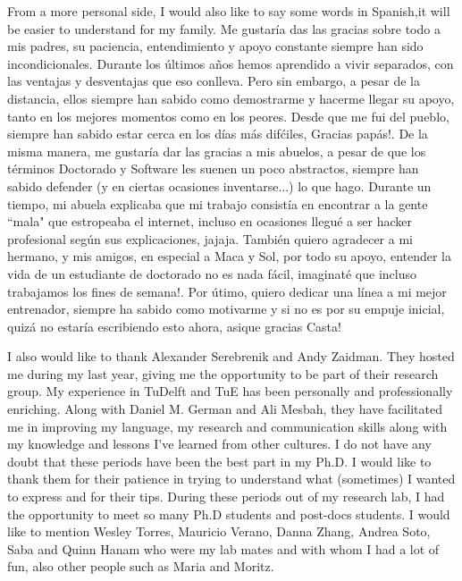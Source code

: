 \documentclass[a4paper, 12pt]{book}
\begin{document}
From a more personal side, I would also like to say some words in Spanish,it will be easier to understand for my family. Me gustar\'ia das las gracias sobre todo a mis padres, su paciencia, entendimiento y apoyo constante siempre han sido incondicionales. Durante los \'ultimos a\~nos hemos aprendido a vivir separados, con las ventajas y desventajas que eso conlleva. Pero sin embargo, a pesar de la distancia, ellos siempre han sabido como demostrarme y hacerme llegar su apoyo, tanto en los mejores momentos como en los peores. Desde que me fui del pueblo, siempre han sabido estar cerca en los d\'ias m\'as dif\'ciles, Gracias pap\'as!. De la misma manera, me gustar\'ia dar las gracias a mis abuelos, a pesar de que los t\'erminos Doctorado y Software les suenen un poco abstractos, siempre han sabido defender (y en ciertas ocasiones inventarse...) lo que hago. Durante un tiempo, mi abuela explicaba que mi trabajo consist\'ia en encontrar a la gente ``mala" que estropeaba el internet, incluso en ocasiones llegu\'e a ser  hacker profesional seg\'un sus explicaciones, jajaja. Tambi\'en quiero agradecer a mi hermano, y mis amigos, en especial a Maca y Sol, por todo su apoyo, entender la vida de un estudiante de doctorado no es nada f\'acil, imaginat\'e que incluso trabajamos los fines de semana!. Por \'utimo, quiero dedicar una l\'inea a mi mejor entrenador, siempre ha sabido como motivarme y si no es por su empuje inicial, quiz\'a no estar\'ia escribiendo esto ahora, asique gracias Casta! 

I also would like to thank Alexander Serebrenik and Andy Zaidman. They hosted me during my last year, giving me the opportunity to be part of their research group. My experience in TuDelft and TuE has been personally and professionally enriching. Along with Daniel M. German and Ali Mesbah, they have facilitated me in improving my language, my research and communication skills along with my knowledge and lessons I've learned from other cultures. I do not have any doubt that these periods have been the best part in my Ph.D. I would like to thank them for their patience in trying to understand what (sometimes) I wanted to express and for their tips. During these periods out of my research lab, I had the opportunity to meet so many Ph.D students and post-docs students. I would like to mention Wesley Torres, Mauricio Verano, Danna Zhang, Andrea Soto, Saba and Quinn Hanam who were my lab mates and with whom I had a lot of fun, also other people such as Maria and Moritz. 
\end{document}
